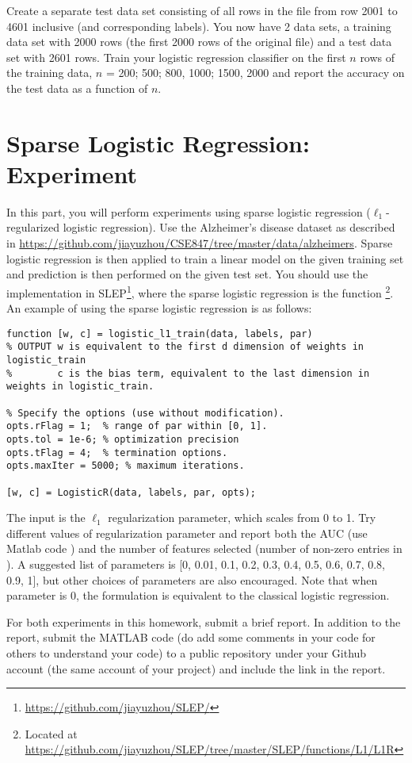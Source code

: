 \documentclass[11pt]{article}
\begin{document}
Create a separate test data set consisting of all rows in the file from row
2001 to 4601 inclusive (and corresponding labels). You now have 2 data sets, a
training data set with 2000 rows (the first 2000 rows of the original file)
and a test data set with 2601 rows. Train your logistic regression classifier
on the first $n$ rows of the training data, $n$ = 200; 500; 800, 1000; 1500, 2000
and report the accuracy on the test data as a function of $n$.



\section{Sparse Logistic Regression: Experiment}
In this part, you will perform experiments using sparse logistic regression
($\ell_1$-regularized logistic regression). Use the Alzheimer's disease dataset
as described in \url{https://github.com/jiayuzhou/CSE847/tree/master/data/alzheimers}.
Sparse logistic regression is then applied
to train a linear model on the given training set and prediction is then performed
on the given test set. You should use the implementation in
SLEP\footnote{\url{https://github.com/jiayuzhou/SLEP/}}, where the sparse
logistic regression is the function \footnote{Located at
\url{https://github.com/jiayuzhou/SLEP/tree/master/SLEP/functions/L1/L1R}}. An
example of using the sparse logistic regression is as follows:
\begin{lstlisting}
function [w, c] = logistic_l1_train(data, labels, par)
% OUTPUT w is equivalent to the first d dimension of weights in logistic_train
%        c is the bias term, equivalent to the last dimension in weights in logistic_train.

% Specify the options (use without modification).
opts.rFlag = 1;  % range of par within [0, 1].
opts.tol = 1e-6; % optimization precision
opts.tFlag = 4;  % termination options. 
opts.maxIter = 5000; % maximum iterations. 
 
[w, c] = LogisticR(data, labels, par, opts);
\end{lstlisting}

The input  is the $\ell_1$ regularization parameter, which scales from 0 to
1. Try different values of regularization parameter and report both the
AUC (use Matlab code ) and the number of features selected (number of non-zero entries in
). A suggested list of parameters is [0, 0.01, 0.1, 0.2, 0.3, 0.4, 0.5, 0.6, 0.7, 0.8, 0.9, 1], but
other choices of parameters are also encouraged. Note that when parameter is 0, 
the formulation is equivalent to the classical logistic regression. 

For both experiments in this homework, submit a brief report. In addition to
the report, submit the MATLAB code (do add some comments in your code for
others to understand your code) to a public repository under your Github
account (the same account of your project) and include the link in the report.
\end{document}
